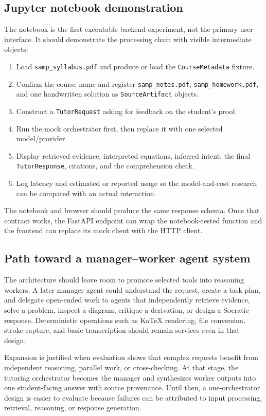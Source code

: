 \documentclass[11pt]{article}
\begin{document}
\subsection{Jupyter notebook demonstration}
The notebook is the first executable backend experiment, not the primary user interface. It should demonstrate the processing chain with visible intermediate objects:
\begin{enumerate}
\item Load \texttt{samp\_syllabus.pdf} and produce or load the \texttt{CourseMetadata} fixture.
\item Confirm the course name and register \texttt{samp\_notes.pdf}, \texttt{samp\_homework.pdf}, and one handwritten solution as \texttt{SourceArtifact} objects.
\item Construct a \texttt{TutorRequest} asking for feedback on the student's proof.
\item Run the mock orchestrator first, then replace it with one selected model/provider.
\item Display retrieved evidence, interpreted equations, inferred intent, the final \texttt{TutorResponse}, citations, and the comprehension check.
\item Log latency and estimated or reported usage so the model-and-cost research can be compared with an actual interaction.
\end{enumerate}

The notebook and browser should produce the same response schema. Once that contract works, the FastAPI endpoint can wrap the notebook-tested function and the frontend can replace its mock client with the HTTP client.

\subsection{Path toward a manager--worker agent system}
The architecture should leave room to promote selected tools into reasoning workers. A later manager agent could understand the request, create a task plan, and delegate open-ended work to agents that independently retrieve evidence, solve a problem, inspect a diagram, critique a derivation, or design a Socratic response. Deterministic operations such as KaTeX rendering, file conversion, stroke capture, and basic transcription should remain services even in that design.

Expansion is justified when evaluation shows that complex requests benefit from independent reasoning, parallel work, or cross-checking. At that stage, the tutoring orchestrator becomes the manager and synthesizes worker outputs into one student-facing answer with source provenance. Until then, a one-orchestrator design is easier to evaluate because failures can be attributed to input processing, retrieval, reasoning, or response generation.
\end{document}
